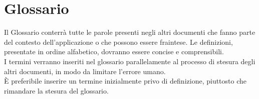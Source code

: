\section{Glossario}
  Il Glossario conterrà tutte le parole presenti negli altri documenti che fanno parte del contesto dell’applicazione o che possono essere fraintese. Le definizioni, presentate in
  ordine alfabetico, dovranno essere concise e comprensibili.\\
  I termini verranno inseriti nel glossario parallelamente al processo di stesura degli altri documenti, in modo da limitare l’errore umano.\\
  È preferibile inserire un termine inizialmente privo di definizione, piuttosto che rimandare la stesura del glossario.
